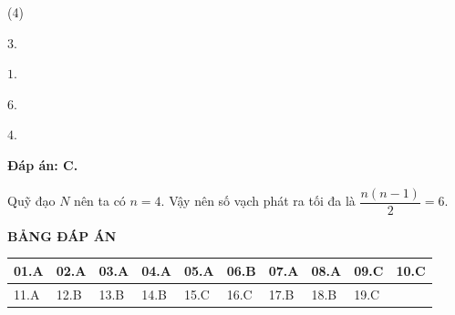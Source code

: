 \begin{enumerate}[label=\bfseries Câu \arabic*:]
{		
		}
	
		\loigiai
		{		\textbf{Đáp án: C.}

Quỹ đạo $ N $ nên ta có $ n = 4 $. Vậy nên số vạch phát ra tối đa là $ \dfrac{n(n-1)}{2} = 6 $.
		}	

\end{enumerate}

\loigiai
{
	\begin{center}
		\textbf{BẢNG ĐÁP ÁN}
	\end{center}
	\begin{center}
		\begin{tabular}{|m{2.8em}|m{2.8em}|m{2.8em}|m{2.8em}|m{2.8em}|m{2.8em}|m{2.8em}|m{2.8em}|m{2.8em}|m{2.8em}|}
			\hline
			01.A  & 02.A  & 03.A  & 04.A   & 05.A  & 06.B  & 07.A & 08.A & 09.C & 10.C \\
			\hline
			11.A  & 12.B  & 13.B  & 14.B   & 15.C  & 16.C  & 17.B & 18.B & 19.C & \\
			\hline
			
		\end{tabular}
	\end{center}
}

\whiteBGstarEnd